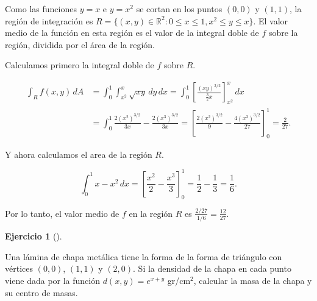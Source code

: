 \documentclass[
  spanish,
  a4paper,
]{scrreport}
\theoremstyle{definition}
\newtheorem{exercise}{Ejercicio}[chapter]
\theoremstyle{remark}
\begin{document}
\begin{tcolorbox}[enhanced jigsaw, arc=.35mm, bottomrule=.15mm, bottomtitle=1mm, breakable, colback=white, colbacktitle=quarto-callout-tip-color!10!white, colframe=quarto-callout-tip-color-frame, coltitle=black, left=2mm, leftrule=.75mm, opacityback=0, opacitybacktitle=0.6, rightrule=.15mm, title=\textcolor{quarto-callout-tip-color}{\faLightbulb}\hspace{0.5em}{Solución}, titlerule=0mm, toprule=.15mm, toptitle=1mm]

Como las funciones \(y=x\) e \(y=x^2\) se cortan en los puntos \((0,0)\)
y \((1,1)\), la región de integración es
\(R=\{(x,y)\in\mathbb{R}^2: 0\leq x\leq 1, x^2\leq y \leq x\}\). El
valor medio de la función en esta región es el valor de la integral
doble de \(f\) sobre la región, dividida por el área de la región.

Calculamos primero la integral doble de \(f\) sobre \(R\).

\begin{align*}
\int_R f(x,y)\,dA 
&= \int_0^1\int_{x^2}^x \sqrt{xy}\,dy\,dx
= \int_0^1 \left[\frac{(xy)^{3/2}}{\frac{3}{2}x}\right]_{x^2}^x\,dx \\
&= \int_0^1 \frac{2 (x^2)^{3/2}}{3x}- \frac{2(x^3)^{3/2}}{3x}
= \left[\frac{2(x^2)^{3/2}}{9} - \frac{4(x^3)^{3/2}}{27} \right]_0^1
= \frac{2}{27}.
\end{align*}

Y ahora calculamos el area de la región \(R\).

\[
\int_0^1 x-x^2\,dx 
= \left[\frac{x^2}{2}-\frac{x^3}{3}\right]_0^1
= \frac{1}{2}-\frac{1}{3}
= \frac{1}{6}.
\]

Por lo tanto, el valor medio de \(f\) en la región \(R\) es
\(\frac{2/27}{1/6} = \frac{12}{27}\).

\end{tcolorbox}

\begin{exercise}[]\protect\hypertarget{exr-masa-lamina-chapa}{}\label{exr-masa-lamina-chapa}

Una lámina de chapa metálica tiene la forma de la forma de triángulo con
vértices \((0,0)\), \((1,1)\) y \((2,0)\). Si la densidad de la chapa en
cada punto viene dada por la función \(d(x,y)=e^{x+y}\) gr/cm\(^2\),
calcular la masa de la chapa y su centro de masas.

\end{exercise}
\end{document}
